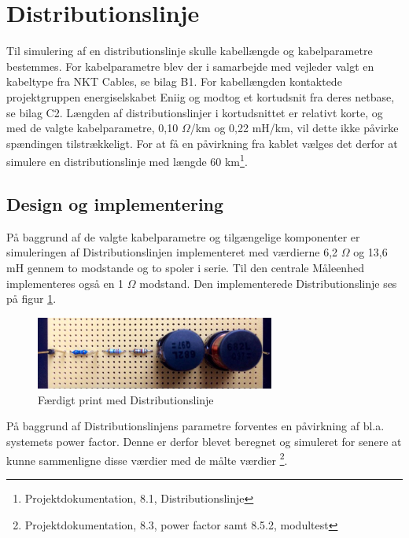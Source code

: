 
\section{Distributionslinje}

Til simulering af en distributionslinje skulle kabellængde og kabelparametre bestemmes. For kabelparametre blev der i samarbejde med vejleder valgt en kabeltype fra NKT Cables, se bilag B1. For kabellængden kontaktede projektgruppen energiselskabet Eniig og modtog et kortudsnit fra deres netbase, se bilag C2. Længden af distributionslinjer i kortudsnittet er relativt korte, og med de valgte kabelparametre, 0,10 $\Omega$/km og 0,22 mH/km, vil dette ikke påvirke spændingen tilstrækkeligt. For at få en påvirkning fra kablet vælges det derfor at simulere en distributionslinje med længde 60 km\footnote{Projektdokumentation, 8.1, Distributionslinje}.  

\subsection{Design og implementering}

På baggrund af de valgte kabelparametre og tilgængelige komponenter er simuleringen af Distributionslinjen implementeret med værdierne 6,2 $\Omega$ og 13,6 mH gennem to modstande og to spoler i serie. Til den centrale Måleenhed implementeres også en 1 $\Omega$ modstand. Den implementerede Distributionslinje ses på figur \ref{fig:DisbLinje}.

\begin{figure}[H]
	\centering
	\includegraphics[width=0.7\textwidth]{figure/Distributionslinje}
	\caption{Færdigt print med Distributionslinje}
	\label{fig:DisbLinje}
\end{figure}

På baggrund af Distributionslinjens parametre forventes en påvirkning af bl.a. systemets power factor. Denne er derfor blevet beregnet og simuleret for senere at kunne sammenligne disse værdier med de målte værdier \footnote{Projektdokumentation, 8.3, power factor samt 8.5.2, modultest}. 